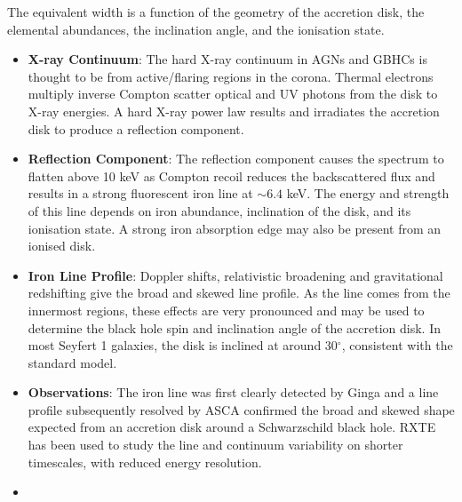 \documentclass[
  letterpaper,
  DIV=11,
  numbers=noendperiod]{scrreprt}
\providecommand{\tightlist}{%
  \setlength{\itemsep}{0pt}\setlength{\parskip}{0pt}}
\begin{document}
The equivalent width is a function of the geometry of the accretion
disk, the elemental abundances, the inclination angle, and the
ionisation state.

\begin{tcolorbox}[enhanced jigsaw, arc=.35mm, bottomrule=.15mm, bottomtitle=1mm, breakable, colback=white, colbacktitle=quarto-callout-important-color!10!white, colframe=quarto-callout-important-color-frame, coltitle=black, left=2mm, leftrule=.75mm, opacityback=0, opacitybacktitle=0.6, rightrule=.15mm, title=\textcolor{quarto-callout-important-color}{\faExclamation}\hspace{0.5em}{Key Points}, titlerule=0mm, toprule=.15mm, toptitle=1mm]

\begin{itemize}
\tightlist
\item
  \textbf{X-ray Continuum}: The hard X-ray continuum in AGNs and GBHCs
  is thought to be from active/flaring regions in the corona. Thermal
  electrons multiply inverse Compton scatter optical and UV photons from
  the disk to X-ray energies. A hard X-ray power law results and
  irradiates the accretion disk to produce a reflection component.
\item
  \textbf{Reflection Component}: The reflection component causes the
  spectrum to flatten above 10 keV as Compton recoil reduces the
  backscattered flux and results in a strong fluorescent iron line at
  \(\sim 6.4\) keV. The energy and strength of this line depends on iron
  abundance, inclination of the disk, and its ionisation state. A strong
  iron absorption edge may also be present from an ionised disk.
\item
  \textbf{Iron Line Profile}: Doppler shifts, relativistic broadening
  and gravitational redshifting give the broad and skewed line profile.
  As the line comes from the innermost regions, these effects are very
  pronounced and may be used to determine the black hole spin and
  inclination angle of the accretion disk. In most Seyfert 1 galaxies,
  the disk is inclined at around 30\(^\circ\), consistent with the
  standard model.
\item
  \textbf{Observations}: The iron line was first clearly detected by
  Ginga and a line profile subsequently resolved by ASCA confirmed the
  broad and skewed shape expected from an accretion disk around a
  Schwarzschild black hole. RXTE has been used to study the line and
  continuum variability on shorter timescales, with reduced energy
  resolution.
\item

\end{itemize}
\end{tcolorbox}
\end{document}
